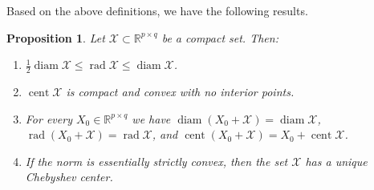 \documentclass[pdflatex,sn-mathphys-num]{sn-jnl}%
\DeclareMathOperator{\rad}{rad}
\DeclareMathOperator{\cent}{cent}
\DeclareMathOperator{\diam}{diam}
\theoremstyle{thmstyleone}
\newtheorem{proposition}[theorem]{Proposition}
\begin{document}
Based on the above definitions, we have the following results. 
\begin{proposition}
\label{prop:chebuniq}
Let $\mathcal{X}\subset\mathbb{R}^{p\times q}$ be a compact set. Then:
\begin{enumerate}[label=\normalfont{(\alph*)},ref=\ref{prop:chebuniq}(\alph*)]
    \item\label{prop:chebuniq-a} $\tfrac{1}{2}\diam\mathcal{X}\leq\rad\mathcal{X}\leq\diam\mathcal{X}$.
    \item\label{prop:chebuniq-b} $\cent \mathcal{X}$ is compact and convex with no interior points.
    \item\label{prop:chebuniq-bc} For every $X_0\in\mathbb{R}^{p\times q}$ we have  $\diam(X_0+\mathcal{X})=\diam\mathcal{X}$, $\rad(X_0+\mathcal{X})=\rad\mathcal{X}$, and $\cent(X_0+\mathcal{X})=X_0+\cent\mathcal{X}$.
    \item\label{prop:chebuniq-c} If the norm is essentially strictly convex, then the set $\mathcal{X}$ has a unique Chebyshev center.
\end{enumerate}
\end{proposition}
\end{document}
